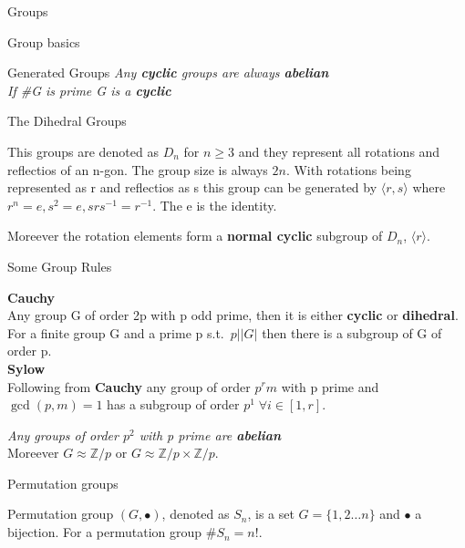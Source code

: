 \documentclass[12pt, letterpaper]{article}
\begin{document}
\begin{section}{Groups}
\begin{subsection}{Group basics}
\begin{subsubsection}{Generated Groups}
      \emph{Any \textbf{cyclic} groups are always \textbf{abelian}} \\
      \emph{If \#G is prime G is a \textbf{cyclic}}

    \end{subsubsection}

    \begin{subsubsection}{The Dihedral Groups}

      This groups are denoted as \(D_{n}\) for \(n \geq 3\) and they represent
      all rotations and reflectios of an n-gon. The group size is always \(2n\).
      With rotations being represented as r and reflectios as s this group can be
      generated by \(\langle r, s \rangle\) where \(r^{n} = e, s^{2} = e, srs^{-1} = r^{-1}\).
      The e is the identity.

      Moreever the rotation elements form a \textbf{normal cyclic} subgroup of \(D_{n}\),
      \(\langle r \rangle\).

    \end{subsubsection}

    \begin{subsubsection}{Some Group Rules}

      \textbf{Cauchy} \\
      Any group G of order 2p with p odd prime, then it is either \textbf{cyclic}
      or \textbf{dihedral}.
      For a finite group G and a prime p s.t.\ \(p | |G|\) then there is a
      subgroup of G of order p. \\

      \textbf{Sylow} \\
      Following from \textbf{Cauchy} any group of order \(p^{r}m\) with p prime
      and \(\gcd(p, m) = 1\) has a subgroup of order
      \(p^{1} \; \forall i \in [1, r]\).

      \emph{Any groups of order \(p^{2}\) with p prime are \textbf{abelian}} \\
      Moreever \(G \approx \mathbb{Z} / p\) or
      \(G \approx \mathbb{Z} / p \times \mathbb{Z} / p\).

    \end{subsubsection}

  \end{subsection}

  \begin{subsection}{Permutation groups}

    Permutation group \((G, \bullet)\), denoted as \(S_{n}\), is a set
    \(G = \{ 1, 2 \dots n \}\) and \(\bullet\) a bijection.
    For a permutation group \(\#S_{n} = n!\). \\


\end{subsection}
\end{section}
\end{document}
